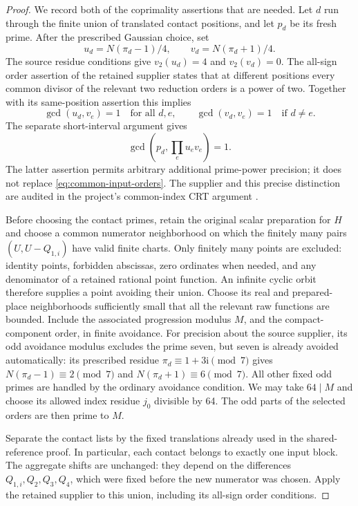 \documentclass[11pt]{article}
\begin{document}
\begin{proof}
We record both of the coprimality assertions that are needed.  Let \(d\)
run through the finite union of translated contact positions, and let
\(p_d\) be its fresh prime.  After the prescribed Gaussian choice, set
\[
                 u_d=N(\pi_d-1)/4,
                 \qquad v_d=N(\pi_d+1)/4.
\]
The source residue conditions give \(v_2(u_d)=4\) and \(v_2(v_d)=0\).
The all-sign order assertion of the retained supplier states that at
different positions every common divisor of the relevant two reduction
orders is a power of two.  Together with its same-position assertion
this implies
\begin{equation}\label{eq:common-input-orders}
 \gcd(u_d,v_e)=1\quad\text{for all }d,e,
 \qquad \gcd(v_d,v_e)=1\quad\text{if }d\ne e.
\end{equation}
The separate short-interval argument gives
\[
              \gcd\!\left(p_d,\prod_eu_ev_e\right)=1.
\]
The latter assertion permits arbitrary additional prime-power precision;
it does not replace \eqref{eq:common-input-orders}.  The supplier and
this precise distinction are audited in the project's common-index
CRT argument \cite{crt}.

Before choosing the contact primes, retain the original scalar
preparation for \(H\) and choose a common numerator neighborhood on
which the finitely many pairs
\((U,U-Q_{1,i})\) have valid finite charts.  Only finitely many points
are excluded: identity points, forbidden abscissas, zero ordinates when
needed, and any denominator of a retained rational point function.
An infinite cyclic orbit therefore supplies a point avoiding their
union.  Choose its real and prepared-place neighborhoods sufficiently
small that all the relevant raw functions are bounded.  Include the
associated progression modulus \(M\), and the compact-component order,
in finite avoidance.  For precision about the source supplier, its
odd avoidance modulus excludes the prime seven, but seven is
already avoided automatically: its prescribed residue
\(\pi_d\equiv1+3\mathrm i\pmod7\) gives
\(N(\pi_d-1)\equiv2\pmod7\) and
\(N(\pi_d+1)\equiv6\pmod7\).  All other fixed odd primes
are handled by the ordinary avoidance condition.  We may take \(64\mid M\) and choose its allowed
index residue \(j_0\) divisible by 64.  The odd parts of the selected
orders are then prime to \(M\).

Separate the contact lists by the fixed translations already used in
the shared-reference proof.  In particular, each contact belongs to
exactly one input block.  The aggregate shifts are unchanged: they
depend on the differences \(Q_{1,i},Q_2,Q_3,Q_4\), which were fixed
before the new numerator was chosen.  Apply the retained supplier to
this union, including its all-sign order conditions.


\end{proof}
\end{document}
